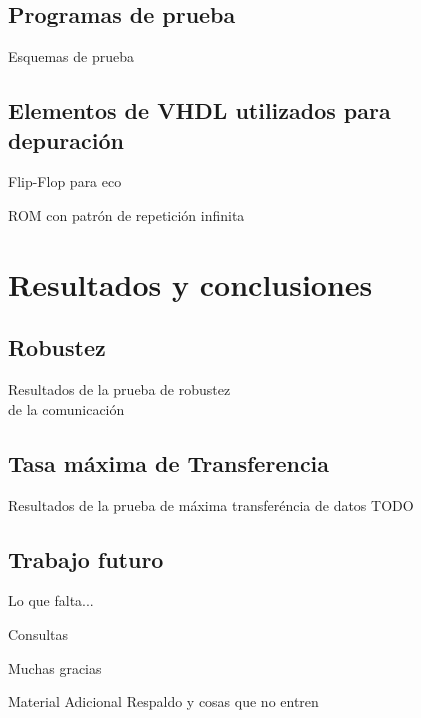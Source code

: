 \documentclass[11pt,a4paper]{beamer}
\begin{document}
		\subsection{Programas de prueba}
			\begin{frame}{Esquemas de prueba}
				
			\end{frame}
		\subsection{Elementos de VHDL utilizados para depuración}
			\begin{frame}{Flip-Flop para eco}
				
			\end{frame}
			\begin{frame}{ROM con patrón de repetición infinita}
				
			\end{frame}
	\section{Resultados y conclusiones}
		\subsection{Robustez}
			\begin{frame}{Resultados de la prueba de robustez\\de la comunicación}
				
			\end{frame}
		\subsection{Tasa máxima de Transferencia}
			\begin{frame}{Resultados de la prueba de máxima transferéncia de datos}
				TODO
			\end{frame}
		\subsection{Trabajo futuro}
			\begin{frame}{Lo que falta...}
				
			\end{frame}
			\begin{frame}{Consultas}
				
			\end{frame}
			\begin{frame}[c]
				\centering
				\alert {Muchas gracias}
			\end{frame}
			
			\begin{frame}{Material Adicional}
				\centering
				Respaldo y cosas que no entren
			\end{frame}
\end{document}
